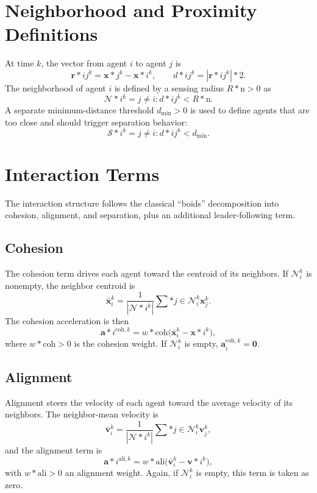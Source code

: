 \documentclass[12pt]{article}
\begin{document}
\section{Neighborhood and Proximity Definitions}
At time $k$, the vector from agent $i$ to agent $j$ is
\begin{equation}
\mathbf{r}*{ij}^k = \mathbf{x}*j^k - \mathbf{x}*i^k, \qquad d*{ij}^k = |\mathbf{r}*{ij}^k|*2.
\end{equation}
The neighborhood of agent $i$ is defined by a sensing radius $R*\mathrm{n} > 0$ as
\begin{equation}
\mathcal{N}*i^k = { j \ne i : d*{ij}^k < R*\mathrm{n} }.
\end{equation}
A separate minimum-distance threshold $d_\mathrm{min} > 0$ is used to define agents that are too close and should trigger separation behavior:
\begin{equation}
\mathcal{S}*i^k = { j \ne i : d*{ij}^k < d_\mathrm{min} }.
\end{equation}

\section{Interaction Terms}
The interaction structure follows the classical ``boids'' decomposition into cohesion, alignment, and separation, plus an additional leader-following term.

\subsection{Cohesion}
The cohesion term drives each agent toward the centroid of its neighbors. If $\mathcal{N}_i^k$ is nonempty, the neighbor centroid is
\begin{equation}
\bar{\mathbf{x}}_i^k = \frac{1}{|\mathcal{N}*i^k|} \sum*{j \in \mathcal{N}_i^k} \mathbf{x}_j^k.
\end{equation}
The cohesion acceleration is then
\begin{equation}
\mathbf{a}*i^{\mathrm{coh},k} = w*\mathrm{coh} \bigl( \bar{\mathbf{x}}_i^k - \mathbf{x}*i^k \bigr),
\end{equation}
where $w*\mathrm{coh} > 0$ is the cohesion weight. If $\mathcal{N}_i^k$ is empty, $\mathbf{a}_i^{\mathrm{coh},k} = \mathbf{0}$.

\subsection{Alignment}
Alignment steers the velocity of each agent toward the average velocity of its neighbors. The neighbor-mean velocity is
\begin{equation}
\bar{\mathbf{v}}_i^k = \frac{1}{|\mathcal{N}*i^k|} \sum*{j \in \mathcal{N}_i^k} \mathbf{v}_j^k,
\end{equation}
and the alignment term is
\begin{equation}
\mathbf{a}*i^{\mathrm{ali},k} = w*\mathrm{ali} \bigl( \bar{\mathbf{v}}_i^k - \mathbf{v}*i^k \bigr),
\end{equation}
with $w*\mathrm{ali} > 0$ an alignment weight. Again, if $\mathcal{N}_i^k$ is empty, this term is taken as zero.
\end{document}
